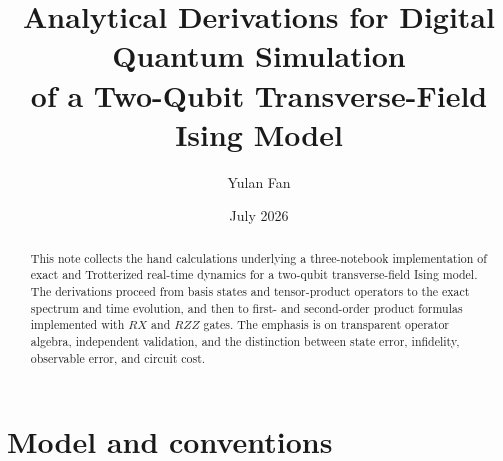 \documentclass[11pt,a4paper]{article}
\title{\textbf{Analytical Derivations for Digital Quantum Simulation\\of a Two-Qubit Transverse-Field Ising Model}}
\author{Yulan Fan}
\date{July 2026}
\begin{document}
\maketitle

\begin{abstract}
This note collects the hand calculations underlying a three-notebook implementation of exact and Trotterized real-time dynamics for a two-qubit transverse-field Ising model. The derivations proceed from basis states and tensor-product operators to the exact spectrum and time evolution, and then to first- and second-order product formulas implemented with $RX$ and $RZZ$ gates. The emphasis is on transparent operator algebra, independent validation, and the distinction between state error, infidelity, observable error, and circuit cost.
\end{abstract}

\tableofcontents
\newpage

\section{Model and conventions}
\end{document}
